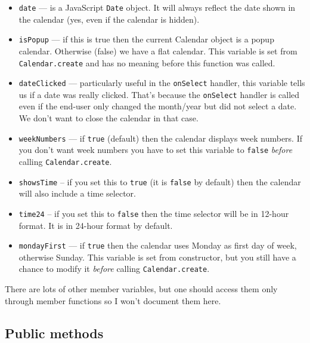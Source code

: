 \documentclass[a4paper,10pt]{article}
\begin{document}
\begin{itemize}

\item \texttt{date} --- is a JavaScript \texttt{Date} object.  It will always
reflect the date shown in the calendar (yes, even if the calendar is hidden).

\item \texttt{isPopup} --- if this is true then the current Calendar object is
a popup calendar.  Otherwise (false) we have a flat calendar.  This variable is
set from \texttt{Calendar.create} and has no meaning before this function was
called.

\item \texttt{dateClicked} --- particularly useful in the \texttt{onSelect}
handler, this variable tells us if a date was really clicked.  That's because
the \texttt{onSelect} handler is called even if the end-user only changed the
month/year but did not select a date.  We don't want to close the calendar in
that case.

\item \texttt{weekNumbers} --- if \texttt{true} (default) then the calendar
displays week numbers.  If you don't want week numbers you have to set this
variable to \texttt{false} \emph{before} calling \texttt{Calendar.create}.

\item \texttt{showsTime} -- if you set this to \texttt{true} (it is
\texttt{false} by default) then the calendar will also include a time selector.

\item \texttt{time24} -- if you set this to \texttt{false} then the time
selector will be in 12-hour format.  It is in 24-hour format by default.

\item \texttt{mondayFirst} --- if \texttt{true} then the calendar uses Monday
as first day of week, otherwise Sunday.  This variable is set from constructor,
but you still have a chance to modify it \emph{before} calling
\texttt{Calendar.create}.

\end{itemize}

There are lots of other member variables, but one should access them only
through member functions so I won't document them here.

\subsection{Public methods}
\end{document}
